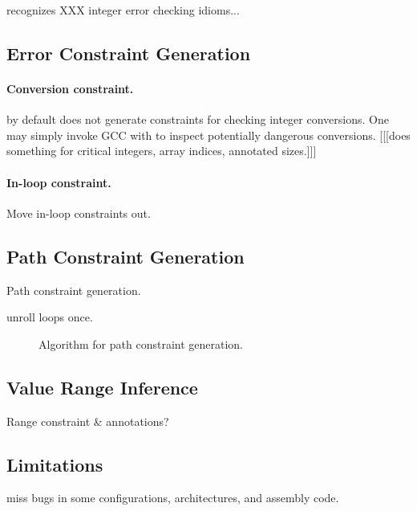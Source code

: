 \sys recognizes XXX integer error checking idioms...

\subsection{Error Constraint Generation}

\paragraph{Conversion constraint.}
\sys by default does not generate constraints for checking integer
conversions.  One may simply invoke GCC with  to
inspect potentially dangerous conversions.
[[[\sys does something for critical integers, array indices, annotated sizes.]]]

\paragraph{In-loop constraint.}
Move in-loop constraints out.

\subsection{Path Constraint Generation}

Path constraint generation.

unroll loops once.

\begin{figure}
\small

\caption{Algorithm for path constraint generation.}
\label{f:path-cstr}
\end{figure}

\subsection{Value Range Inference}

Range constraint \& annotations?

\subsection{Limitations}

miss bugs in some configurations, architectures,
and assembly code.

